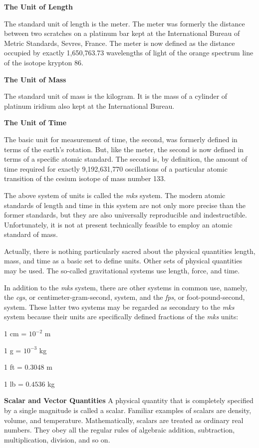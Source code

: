\documentclass[a4paper]{article}
\begin{document}
\textbf{The Unit of Length}

The standard unit of length is the meter. The meter was formerly the distance between two scratches on a platinum bar kept
at the International Bureau of Metric Standards, Sevres, France. The meter is now defined as the distance occupied by
exactly 1,650,763.73 wavelengths of light of the orange spectrum line of the isotope krypton 86.

\textbf{The Unit of Mass}

The standard unit of mass is the kilogram. It is the mass of a cylinder of platinum iridium also kept at the International
Bureau.

\textbf{The Unit of Time}

The basic unit for measurement of time, the second, was formerly defined in terms of the earth's rotation. But, like the
meter, the second is now defined in terms of a specific atomic standard. The second is, by definition, the amount of time
required for exactly 9,192,631,770 oscillations of a particular atomic transition of the cesium isotope of mass number 133.

The above system of units is called the \textit{mks} system. The modern atomic standards of length and time in this system are not
only more precise than the former standards, but they are also universally reproducible and indestructible. Unfortunately,
it is not at present technically feasible to employ an atomic standard of mass.

Actually, there is nothing particularly sacred about the physical quantities length, mass, and time as a basic set to
define units. Other sets of physical quantities may be used. The so-called gravitational systems use length, force, and time.

In addition to the \textit{mks} system, there are other systems in common use, namely, the \textit{cgs}, or centimeter-gram-second, system,
and the \textit{fps}, or foot-pound-second, system. These latter two systems may be regarded as secondary to the \textit{mks} system because
their units are specifically defined fractions of the \textit{mks} units:

\begin{center}
1 cm = $10^{-2}$ m

1 g = $10^{-3}$ kg

1 ft = $0.3048$ m

1 lb = $0.4536$ kg
\end{center}

\textbf{Scalar and Vector Quantities}
A physical quantity that is completely specified by a single magnitude is called a scalar. Familiar examples of scalars are
density, volume, and temperature. Mathematically, scalars are treated as ordinary real numbers. They obey all the regular
rules of algebraic addition, subtraction, multiplication, division, and so on.
\end{document}
